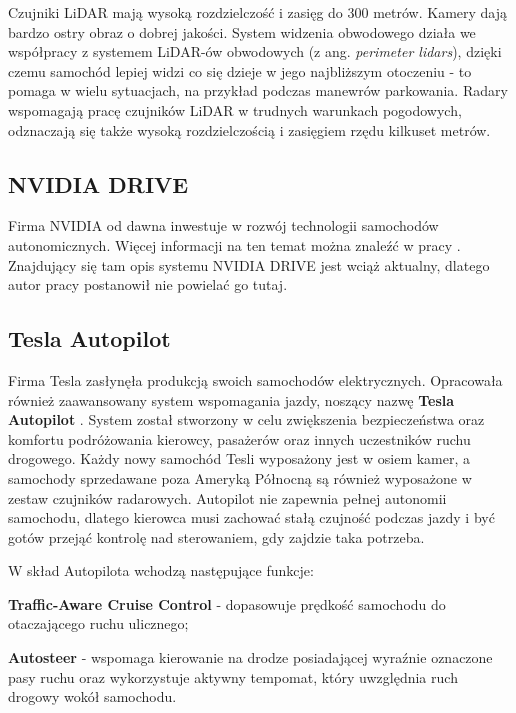 Czujniki LiDAR mają wysoką rozdzielczość i zasięg do 300 metrów. Kamery dają bardzo ostry obraz o dobrej jakości. System widzenia obwodowego działa we współpracy z systemem LiDAR-ów obwodowych (z ang. \textit{perimeter lidars}), dzięki czemu samochód lepiej widzi co się dzieje w jego najbliższym otoczeniu - to pomaga w wielu sytuacjach, na przykład podczas manewrów parkowania. Radary wspomagają pracę czujników LiDAR w trudnych warunkach pogodowych, odznaczają się także wysoką rozdzielczością i zasięgiem rzędu kilkuset metrów.

\subsection{NVIDIA DRIVE}
Firma NVIDIA od dawna inwestuje w rozwój technologii samochodów autonomicznych. Więcej informacji na ten temat można znaleźć w pracy \cite{galios:thesis}. Znajdujący się tam opis systemu NVIDIA DRIVE jest wciąż aktualny, dlatego autor pracy postanowił nie powielać go tutaj.

\subsection{Tesla Autopilot}
Firma Tesla zasłynęła produkcją swoich samochodów elektrycznych. Opracowała również zaawansowany system wspomagania jazdy, noszący nazwę \textbf{Tesla Autopilot} \cite{tesla:autopilotOverview}. System został stworzony w celu zwiększenia bezpieczeństwa oraz komfortu podróżowania kierowcy, pasażerów oraz innych uczestników ruchu drogowego. Każdy nowy samochód Tesli wyposażony jest w osiem kamer, a samochody sprzedawane poza Ameryką Północną są również wyposażone w zestaw czujników radarowych. Autopilot nie zapewnia pełnej autonomii samochodu, dlatego kierowca musi zachować stałą czujność podczas jazdy i być gotów przejąć kontrolę nad sterowaniem, gdy zajdzie taka potrzeba.

W skład Autopilota wchodzą następujące funkcje:
\begin{enumerate*}
\item \textbf{Traffic-Aware Cruise Control} - dopasowuje prędkość samochodu do otaczającego ruchu ulicznego;
\item \textbf{Autosteer} - wspomaga kierowanie na drodze posiadającej wyraźnie oznaczone pasy ruchu oraz wykorzystuje aktywny tempomat, który uwzględnia ruch drogowy wokół samochodu.
\end{enumerate*}

